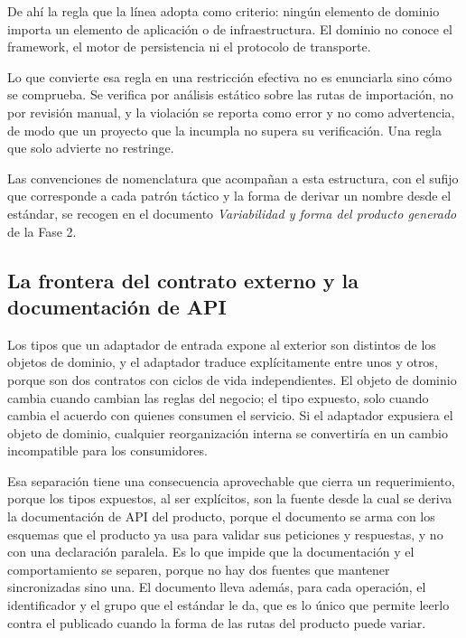 De ahí la regla que la línea adopta como criterio: ningún elemento de dominio
importa un elemento de aplicación o de infraestructura. El dominio no conoce
el framework, el motor de persistencia ni el protocolo de transporte.

Lo que convierte esa regla en una restricción efectiva no es enunciarla sino
cómo se comprueba. Se verifica por análisis estático sobre las rutas de
importación, no por revisión manual, y la violación se reporta como error y
no como advertencia, de modo que un proyecto que la incumpla no supera su
verificación. Una regla que solo advierte no restringe.

Las convenciones de nomenclatura que acompañan a esta estructura, con el
sufijo que corresponde a cada patrón táctico y la forma de derivar un nombre
desde el estándar, se recogen en el documento \emph{Variabilidad y forma del
producto generado} de la Fase 2.

\subsection{La frontera del contrato externo y la documentación de API}

Los tipos que un adaptador de entrada expone al exterior son distintos de los
objetos de dominio, y el adaptador traduce explícitamente entre unos y otros,
porque son dos contratos con ciclos de vida independientes. El objeto de
dominio cambia cuando cambian las reglas del negocio; el tipo expuesto, solo
cuando cambia el acuerdo con quienes consumen el servicio. Si el adaptador
expusiera el objeto de dominio, cualquier reorganización interna se
convertiría en un cambio incompatible para los consumidores.

Esa separación tiene una consecuencia aprovechable que cierra un
requerimiento, porque los tipos expuestos, al ser explícitos, son la fuente
desde la cual se deriva la documentación de API del producto, porque el
documento se arma con los esquemas que el producto ya usa para validar sus
peticiones y respuestas, y no con una declaración paralela. Es lo que impide
que la documentación y el comportamiento se separen, porque no hay dos fuentes
que mantener sincronizadas sino una. El documento lleva además, para cada
operación, el identificador y el grupo que el estándar le da, que es lo único
que permite leerlo contra el publicado cuando la forma de las rutas del
producto puede variar.

